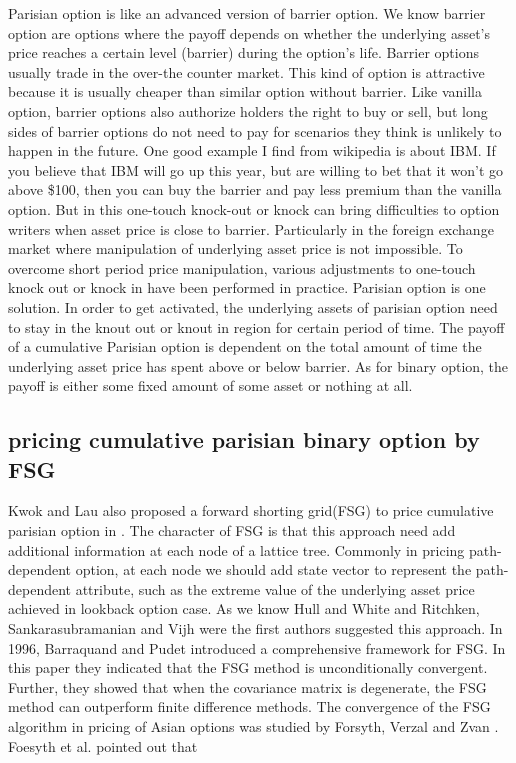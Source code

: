 \documentclass[11pt]{book}
\begin{document}
Parisian option is like an advanced version of barrier option. We know barrier option are options where the payoff depends on whether the underlying asset's price reaches a certain level (barrier) during the option's life. Barrier options usually trade in the over-the counter market. This kind of option is attractive because it is usually cheaper than similar option without barrier. Like vanilla option, barrier options also authorize holders the right to buy or sell, but  long sides of barrier options do not need to pay for scenarios they think is unlikely to happen in the future. One good example I find from wikipedia is about IBM. If you believe that IBM will go up this year, but are willing to bet that it won't go above \$100, then you can buy the barrier and pay less premium than the vanilla option. But in this one-touch knock-out or knock can bring difficulties to option writers when asset price is close to barrier. Particularly in the foreign exchange market where manipulation of underlying asset price is not impossible. To overcome short period price manipulation, various adjustments to one-touch knock out or knock in have been performed in practice. Parisian option is one solution.  In order to get activated, the underlying assets of parisian option need to stay in the knout out or knout in region for certain period of time. The payoff of a cumulative Parisian option is dependent on the total amount of time the underlying asset price has spent above or below barrier. As for binary option, the payoff is either some fixed amount of some asset or nothing at all.

\subsection{pricing cumulative parisian binary option by FSG}
Kwok and Lau also proposed a forward shorting grid(FSG) to price cumulative parisian option in \cite{Kwok2001}. The character of FSG is that this approach need add additional information at each node of  a lattice tree. Commonly in pricing path-dependent option, at each node we should add state vector to represent the path-dependent attribute, such as the extreme value of the underlying asset price achieved in lookback option case. As we know Hull and White \cite{Hull1993} and Ritchken, Sankarasubramanian and Vijh \cite{Vijh1993} were the first authors suggested this approach. In 1996, Barraquand and Pudet \cite{Barraquand1996} introduced a comprehensive framework for FSG. In this paper they indicated that the FSG method is unconditionally convergent. Further, they showed that when the covariance matrix is degenerate, the FSG method can outperform finite difference methods. The convergence of the FSG algorithm in pricing of Asian options was studied by Forsyth, Verzal and Zvan \cite{Forsyth1999}. Foesyth et al. pointed out that
\end{document}
